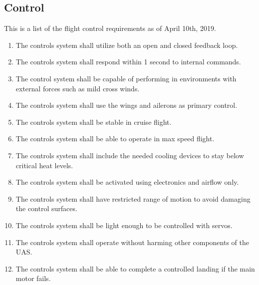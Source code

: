 \documentclass{article}
\begin{document}
\subsection{Control}
This is a list of the flight control requirements as of April 10th, 2019.
\begin{enumerate}
  \item{The controls system shall utilize both an open and closed feedback loop.}
  \item{The controls system shall respond within 1 second to internal commands.}
  \item{The control system shall be capable of performing in environments with external forces such as mild cross winds.}
  \item{The controls system shall use the wings and ailerons as primary control.}
  \item{The controls system shall be stable in cruise flight.}
  \item{The controls system shall be able to operate in max speed flight.}
  \item{The controls system shall include the needed cooling devices to stay below critical heat levels.}
  \item{The controls system shall be activated using electronics and airflow only.}
  \item{The controls system shall have restricted range of motion to avoid damaging the control surfaces.}
  \item{The controls system shall be light enough to be controlled with servos.}
  \item{The controls system shall operate without harming other components of the UAS.}
  \item{The controls system shall be able to complete a controlled landing if the main motor fails.}
\end{enumerate}
\end{document}
